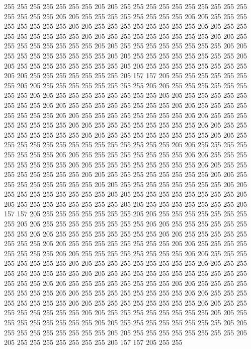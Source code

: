 255 255 255 255 255 255 255 205 205 255 255 255 255 255 255 255 255 255 255 255
255 255 255 205 205 255 255 255 255 255 255 255 255 205 205 255 255 255 255 255
255 255 255 205 205 255 255 255 255 255 255 255 255 205 205 255 255 255 255 255
255 255 255 205 205 255 255 255 255 255 255 255 255 205 205 255 255 255 255 255
255 255 255 205 205 255 255 255 255 255 255 255 255 205 205 255 255 255 255 255
255 255 255 205 205 255 255 255 255 255 255 255 255 205 205 255 255 255 255 255
255 255 255 205 205 255 255 255 255 255 255 255 255 205 205 255 255 255 255 255
255 255 205 157 157 205 255 255 255 255 255 255 255 205 205 255 255 255 255 255
255 255 255 205 205 255 255 255 255 255 255 255 255 205 205 255 255 255 255 255
255 255 255 205 205 255 255 255 255 255 255 255 255 205 205 255 255 255 255 255
255 255 255 205 205 255 255 255 255 255 255 255 255 205 205 255 255 255 255 255
255 255 255 205 205 255 255 255 255 255 255 255 255 205 205 255 255 255 255 255
255 255 255 205 205 255 255 255 255 255 255 255 255 205 205 255 255 255 255 255
255 255 255 205 205 255 255 255 255 255 255 255 255 255 255 255 255 255 255 205
205 255 255 255 255 255 255 255 255 205 205 255 255 255 255 255 255 255 255 205
205 255 255 255 255 255 255 255 255 205 205 255 255 255 255 255 255 255 255 205
205 255 255 255 255 255 255 255 255 205 205 255 255 255 255 255 255 255 255 205
205 255 255 255 255 255 255 255 255 205 205 255 255 255 255 255 255 255 255 205
205 255 255 255 255 255 255 255 255 205 205 255 255 255 255 255 255 255 255 205
205 255 255 255 255 255 255 255 255 205 205 255 255 255 255 255 255 255 205 157
157 205 255 255 255 255 255 255 255 205 205 255 255 255 255 255 255 255 255 205
205 255 255 255 255 255 255 255 255 205 205 255 255 255 255 255 255 255 255 205
205 255 255 255 255 255 255 255 255 205 205 255 255 255 255 255 255 255 255 205
205 255 255 255 255 255 255 255 255 205 205 255 255 255 255 255 255 255 255 205
205 255 255 255 255 255 255 255 255 205 205 255 255 255 255 255 255 255 255 205
205 255 255 255 255 255 255 255 255 205 205 255 255 255 255 255 255 255 255 205
205 255 255 255 255 255 255 255 255 255 255 255 255 255 255 205 205 255 255 255
255 255 255 255 255 205 205 255 255 255 255 255 255 255 255 205 205 255 255 255
255 255 255 255 255 205 205 255 255 255 255 255 255 255 255 205 205 255 255 255
255 255 255 255 255 205 205 255 255 255 255 255 255 255 255 205 205 255 255 255
255 255 255 255 255 205 205 255 255 255 255 255 255 255 255 205 205 255 255 255
255 255 255 255 255 205 205 255 255 255 255 255 255 255 255 205 205 255 255 255
255 255 255 255 255 205 205 255 255 255 255 255 255 255 205 157 157 205 255 255
